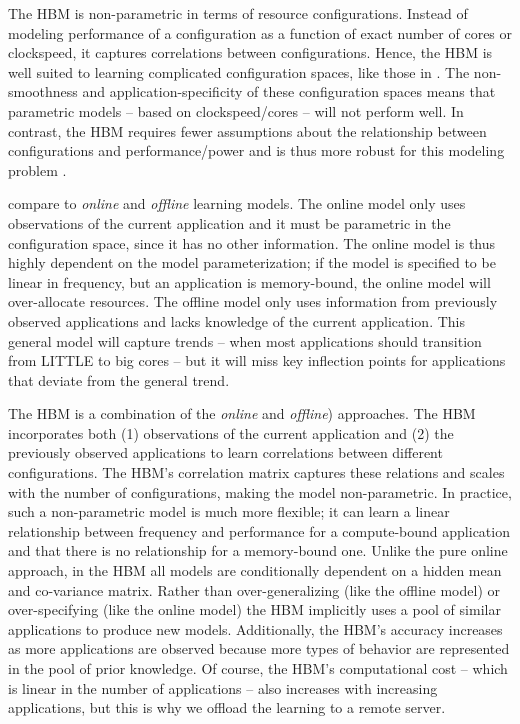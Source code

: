 The HBM is non-parametric in terms of resource configurations. Instead
of modeling performance of a configuration as a function of exact
number of cores or clockspeed, it captures correlations between
configurations.  Hence, the HBM is well suited to learning complicated
configuration spaces, like those in
.  The non-smoothness
and application-specificity of these configuration spaces means that
parametric models -- based on clockspeed/cores -- will not perform
well.  In contrast, the HBM requires fewer assumptions about the
relationship between configurations and performance/power and is thus
more robust for this modeling problem \cite{LEO}.

 compare \SYSTEM{} to \emph{online} and
\emph{offline} learning models.  The online model only uses
observations of the current application and it must be parametric in
the configuration space, since it has no other information. The online
model is thus highly dependent on the model parameterization; \eg{} if
the model is specified to be linear in frequency, but an application
is memory-bound, the online model will over-allocate resources.  The
offline model only uses information from previously observed
applications and lacks knowledge of the current application.  This
general model will capture trends -- \eg{} when most applications
should transition from LITTLE to big cores -- but it will miss key
inflection points for applications that deviate from the general
trend.

The HBM is a combination of the \emph{online} and \emph{offline})
approaches. The HBM incorporates both (1) observations of the current
application and (2) the previously observed applications to learn
correlations between different configurations.  The HBM's correlation
matrix captures these relations and scales with the number of
configurations, making the model non-parametric.  In practice, such a
non-parametric model is much more flexible; \eg{} it can learn a
linear relationship between frequency and performance for a
compute-bound application and that there is no relationship for a
memory-bound one.  Unlike the pure online approach, in the HBM all
models are conditionally dependent on a hidden mean and co-variance
matrix.  Rather than over-generalizing (like the offline model) or
over-specifying (like the online model) the HBM implicitly uses a pool
of similar applications to produce new models. Additionally, the HBM's
accuracy increases as more applications are observed because more
types of behavior are represented in the pool of prior knowledge.  Of
course, the HBM's computational cost -- which is linear in the number
of applications -- also increases with increasing applications, but
this is why we offload the learning to a remote server.

